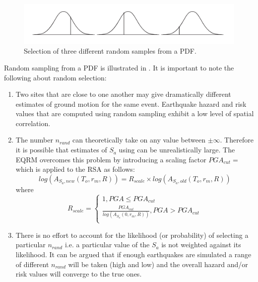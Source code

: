 \begin{figure}
\includegraphics[width=1\textwidth]{diags/fig-hattn-random.pdf}
\caption{Selection of three different random samples from a PDF.}
\label{fig:hattn-randomsamp}
\end{figure}
Random sampling from a PDF is illustrated in
. It is important to note the following
about random selection:
\begin{enumerate}
\item Two sites that are close to one another may give
dramatically different estimates of ground motion for the same
event. Earthquake hazard and risk values that are computed using
random sampling exhibit a low level of spatial correlation.
\item
The number $n_{rand}$ can theoretically take on any value between
$\pm \infty$. Therefore it is possible that estimates of $S_a$ using
 can be unrealistically large. The EQRM
overcomes this problem by introducing a scaling factor
$PGA_{cut}=$ which is
applied to the RSA as follows:
\begin{equation}
 log(A_{S_a,new}(T_o,r_m,R)) = R_{scale} \times
log(A_{S_a,old}(T_o,r_m,R))
\end{equation}
where
\begin{equation}\label{rw}
R_{scale}  =
\begin{cases}
1,  PGA \leq PGA_{cut}\\
\frac{PGA_{cut}}{log(A_{S_a}(0,r_m,R))},
PGA > PGA_{cut}\\
\end{cases}
\end{equation}

\item There is no effort to account for the likelihood (or
probability) of selecting a particular $n_{rand}$ i.e. a particular
value of the $S_a$ is not weighted against its likelihood. It can be
argued that if enough earthquakes are simulated a range of different
$n_{rand}$ will be taken (high and low) and the overall hazard
and/or risk values will converge to the true ones.
\end{enumerate}


